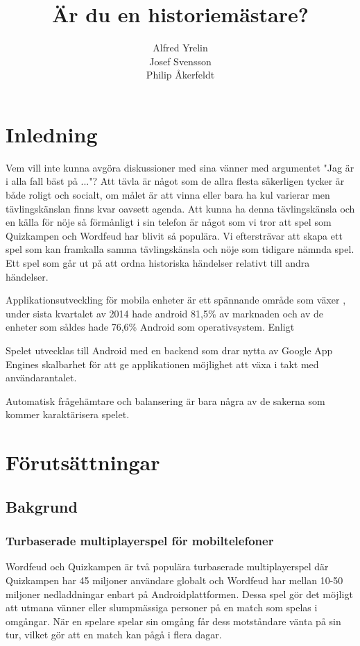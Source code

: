 \documentclass[12pt,a4paper]{article}
\author{Alfred Yrelin\\Josef Svensson\\Philip Åkerfeldt}
\title{Är du en historiemästare?}
\begin{document}
\maketitle
\newpage
\tableofcontents
\pagebreak

\section{Inledning}
Vem vill inte kunna avgöra diskussioner med sina vänner med argumentet "Jag är i alla fall bäst på ..."? 
Att tävla är något som de allra flesta säkerligen tycker är både roligt och socialt, om målet är att vinna eller bara ha kul varierar men tävlingskänslan finns kvar oavsett agenda. Att kunna ha denna tävlingskänsla och en källa för nöje så förmånligt i sin telefon är något som vi tror att spel som Quizkampen\cite{quiz} och Wordfeud har blivit så populära. Vi eftersträvar att skapa ett spel som kan framkalla samma tävlingskänsla och nöje som tidigare nämnda spel. Ett spel som går ut på att ordna historiska händelser relativt till andra händelser. 

Applikationsutveckling för mobila enheter är ett spännande område som växer \cite{IDC}, under sista kvartalet av 2014 hade android 81,5\% av marknaden och av de enheter som såldes hade 76,6\% Android som operativsystem.   Enligt \cite{revenue}

Spelet utvecklas till Android med en backend som drar nytta av Google App Engines skalbarhet för att ge applikationen möjlighet att växa i takt med användarantalet. 


 Automatisk frågehämtare och balansering är bara några av de sakerna som kommer karaktärisera spelet.


\section{Förutsättningar}

\subsection{Bakgrund}


\subsubsection{Turbaserade multiplayerspel för mobiltelefoner}
Wordfeud och Quizkampen är två populära turbaserade multiplayerspel där Quizkampen har 45 miljoner användare globalt\cite{quiz} och Wordfeud har mellan 10-50 miljoner nedladdningar enbart på Androidplattformen\cite{wordfeud}. Dessa spel gör det möjligt att utmana vänner eller slumpmässiga personer på en match som spelas i omgångar. När en spelare spelar sin omgång får dess motståndare vänta på sin tur, vilket gör att en match kan pågå i flera dagar.
\end{document}
